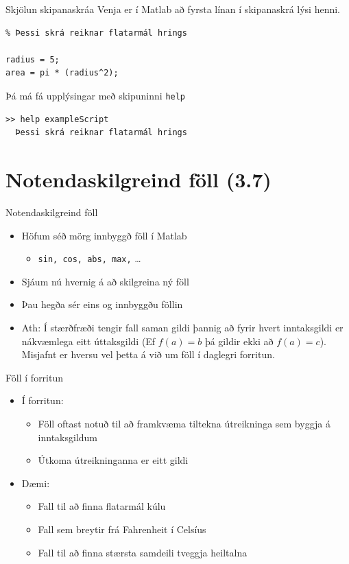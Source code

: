 \documentclass[handout]{beamer}
\begin{document}
\begin{frame}[fragile]{Skjölun skipanaskráa}
\vspace{\baselineskip}
Venja er í Matlab að fyrsta línan í skipanaskrá lýsi henni.
\begin{verbatim}
% Þessi skrá reiknar flatarmál hrings

radius = 5;
area = pi * (radius^2);
\end{verbatim}
Þá má fá upplýsingar með skipuninni \texttt{help}
\begin{verbatim}
>> help exampleScript
  Þessi skrá reiknar flatarmál hrings
\end{verbatim}
\end{frame}

\section{Notendaskilgreind föll (3.7)}

\begin{frame}{Notendaskilgreind föll}
\begin{itemize}
 \item Höfum séð mörg innbyggð föll í Matlab
 \begin{itemize}
  \item \texttt{sin, cos, abs, max,} \ldots
 \end{itemize}
 \item Sjáum nú hvernig á að skilgreina ný föll
 \item Þau hegða sér eins og innbyggðu föllin
 \item Ath: Í stærðfræði tengir fall saman gildi þannig að fyrir hvert inntaksgildi er nákvæmlega eitt úttaksgildi (Ef $f(a) = b$ þá gildir ekki að $f(a) = c$). Misjafnt er hversu vel þetta á við um föll í daglegri forritun.
\end{itemize}
\end{frame}

\begin{frame}{Föll í forritun}
\begin{itemize}
 \item Í forritun:
 \begin{itemize}
  \item Föll oftast notuð til að framkvæma tiltekna útreikninga sem byggja á inntaksgildum
  \item Útkoma útreikninganna er eitt gildi
 \end{itemize}
 \item Dæmi:
 \begin{itemize}
  \item Fall til að finna flatarmál kúlu
  \item Fall sem breytir frá Fahrenheit í Celsíus
  \item Fall til að finna stærsta samdeili tveggja heiltalna
 \end{itemize}
\end{itemize}
\end{frame}
\end{document}
